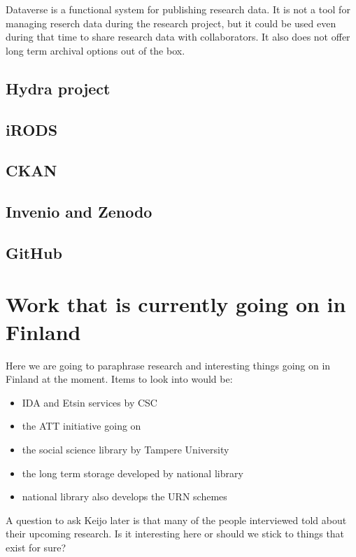 Dataverse is a functional system for publishing research data. It is not a tool
for managing reserch data during the research project, but it could be used
even during that time to share research data with collaborators. It also does
not offer long term archival options out of the box.

\subsection{Hydra project}

\subsection{iRODS}

\subsection{CKAN}

\subsection{Invenio and Zenodo}

\subsection{GitHub}

\section{Work that is currently going on in Finland}
\label{sec:finland_current}

Here we are going to paraphrase research and interesting things going on in
Finland at the moment. Items to look into would be:

\begin{itemize}
    \item IDA and Etsin services by CSC
    \item the ATT initiative going on
    \item the social science library by Tampere University
    \item the long term storage developed by national library
    \item national library also develops the URN schemes
\end{itemize}

A question to ask Keijo later is that many of the people interviewed told about
their upcoming research. Is it interesting here or should we stick to things
that exist for sure?

